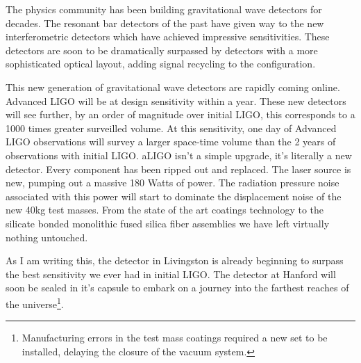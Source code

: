 

%

The physics community has been building gravitational wave detectors for
decades.
The resonant bar detectors of the past have given way to the new
interferometric detectors which have achieved impressive sensitivities.
These detectors are soon to be dramatically surpassed
by detectors with a more sophisticated optical layout, adding
signal recycling to the configuration.

This new generation of gravitational wave detectors are rapidly coming
online.
Advanced LIGO will be at design sensitivity within a year.
These new detectors will see further, by an order of magnitude over
initial LIGO, this corresponds to a 1000 times greater surveilled volume.
At this sensitivity, one day of Advanced LIGO observations will survey a
larger space-time volume than the 2 years of observations with initial LIGO.
aLIGO isn't a simple upgrade, it's literally a new detector.
Every component has been ripped out and replaced.
The laser source is new, pumping out a massive
180 Watts of power.
The radiation pressure noise associated with this power will start to
dominate the displacement noise of the new 40kg test masses.
From the state of the art coatings technology to the silicate bonded
monolithic fused silica fiber assemblies we have left virtually
nothing untouched.

As I am writing this,
the detector in Livingston is already beginning to surpass the
best sensitivity we ever had in initial LIGO. The detector at Hanford will
soon be sealed in it's capsule to embark on a journey into the farthest
reaches of the
universe\footnote{Manufacturing errors in the test mass coatings required a new
set to be installed, delaying the closure of the vacuum system.}.


